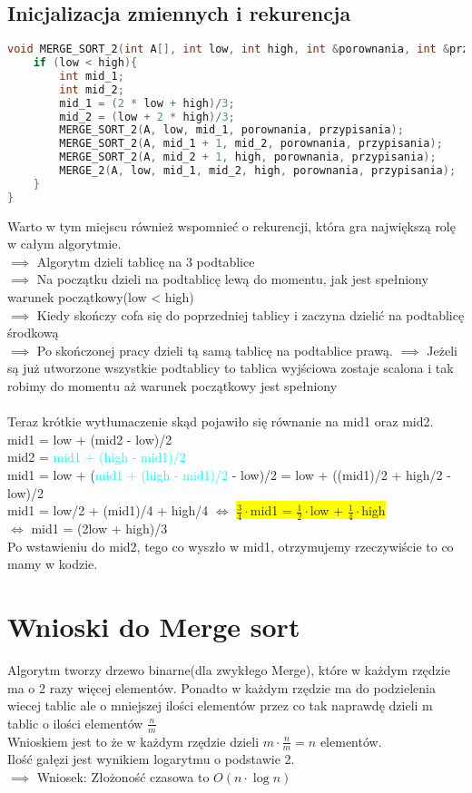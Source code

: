\documentclass[12pt,a4paper]{article}
\begin{document}
\subsection{Inicjalizacja zmiennych i rekurencja}
\begin{lstlisting}[language=C++]
void MERGE_SORT_2(int A[], int low, int high, int &porownania, int &przypisania){
    if (low < high){
        int mid_1;
        int mid_2;
        mid_1 = (2 * low + high)/3;
        mid_2 = (low + 2 * high)/3;
        MERGE_SORT_2(A, low, mid_1, porownania, przypisania);
        MERGE_SORT_2(A, mid_1 + 1, mid_2, porownania, przypisania);
        MERGE_SORT_2(A, mid_2 + 1, high, porownania, przypisania);
        MERGE_2(A, low, mid_1, mid_2, high, porownania, przypisania);
    }
}
\end{lstlisting}
Warto w tym miejscu również wspomnieć o rekurencji, która gra największą rolę w całym algorytmie.\\
$\implies$ Algorytm dzieli tablicę na 3 podtablice\\
$\implies$ Na początku dzieli na podtablicę lewą do momentu, jak jest spełniony warunek początkowy(low < high)\\
$\implies$ Kiedy skończy cofa się do poprzedniej tablicy i zaczyna dzielić na podtablicę środkową\\
$\implies$ Po skończonej pracy dzieli tą samą tablicę na podtablice prawą.
$\implies$ Jeżeli są już utworzone wszystkie podtablicy to tablica wyjściowa zostaje scalona i tak robimy do momentu aż warunek początkowy jest spełniony\\
\\
Teraz krótkie wytłumaczenie skąd pojawiło się równanie na mid1 oraz mid2.\\
mid1 = low + (mid2 - low)/2\\
mid2 = \textcolor{cyan}{mid1 + (high - mid1)/2}\\
mid1 = low + (\textcolor{cyan}{mid1 + (high - mid1)/2} - low)/2 = low + ((mid1)/2 + high/2 -low)/2\\
mid1 = low/2 + (mid1)/4 + high/4 $\iff$ \colorbox{yellow}{$\frac{3}{4}\cdot$mid1 = $\frac{1}{2}\cdot$low + $\frac{1}{4}\cdot$high}\\ $\iff$ mid1 = (2low + high)/3\\
Po wstawieniu do mid2, tego co wyszło w mid1, otrzymujemy rzeczywiście to co mamy w kodzie.
\section{Wnioski do Merge sort}
Algorytm tworzy drzewo binarne(dla zwykłego Merge), które w każdym rzędzie ma o 2 razy więcej elementów. Ponadto w każdym rzędzie ma do podzielenia wiecej tablic ale o mniejszej ilości elementów przez co tak naprawdę dzieli m tablic o ilości elementów $\frac{n}{m}$\\
Wnioskiem jest to że w każdym rzędzie dzieli $m\cdot\frac{n}{m}=n$ elementów.\\ Ilość gałęzi jest wynikiem logarytmu o podstawie 2.\\
$\implies$ Wniosek: Złożoność czasowa to $O(n \cdot \log n)$
\end{document}
